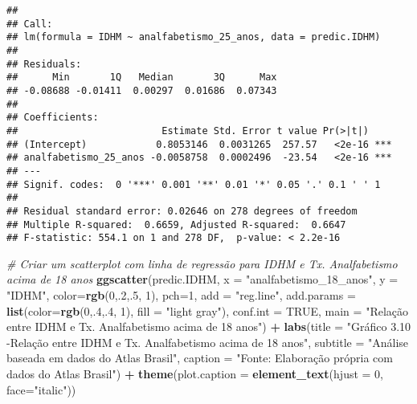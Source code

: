 \documentclass[
]{article}
\newenvironment{Shaded}{\begin{snugshade}}{\end{snugshade}}
\newcommand{\AttributeTok}[1]{\textcolor[rgb]{0.13,0.29,0.53}{#1}}
\newcommand{\CommentTok}[1]{\textcolor[rgb]{0.56,0.35,0.01}{\textit{#1}}}
\newcommand{\ConstantTok}[1]{\textcolor[rgb]{0.56,0.35,0.01}{#1}}
\newcommand{\DecValTok}[1]{\textcolor[rgb]{0.00,0.00,0.81}{#1}}
\newcommand{\FunctionTok}[1]{\textcolor[rgb]{0.13,0.29,0.53}{\textbf{#1}}}
\newcommand{\NormalTok}[1]{#1}
\newcommand{\SpecialCharTok}[1]{\textcolor[rgb]{0.81,0.36,0.00}{\textbf{#1}}}
\newcommand{\StringTok}[1]{\textcolor[rgb]{0.31,0.60,0.02}{#1}}
\begin{document}
\begin{verbatim}
## 
## Call:
## lm(formula = IDHM ~ analfabetismo_25_anos, data = predic.IDHM)
## 
## Residuals:
##      Min       1Q   Median       3Q      Max 
## -0.08688 -0.01411  0.00297  0.01686  0.07343 
## 
## Coefficients:
##                         Estimate Std. Error t value Pr(>|t|)    
## (Intercept)            0.8053146  0.0031265  257.57   <2e-16 ***
## analfabetismo_25_anos -0.0058758  0.0002496  -23.54   <2e-16 ***
## ---
## Signif. codes:  0 '***' 0.001 '**' 0.01 '*' 0.05 '.' 0.1 ' ' 1
## 
## Residual standard error: 0.02646 on 278 degrees of freedom
## Multiple R-squared:  0.6659, Adjusted R-squared:  0.6647 
## F-statistic: 554.1 on 1 and 278 DF,  p-value: < 2.2e-16
\end{verbatim}

\begin{Shaded}
\begin{Highlighting}[]
\CommentTok{\# Criar um scatterplot com linha de regressão para IDHM e Tx. Analfabetismo acima de 18 anos}
\FunctionTok{ggscatter}\NormalTok{(predic.IDHM, }\AttributeTok{x =} \StringTok{"analfabetismo\_18\_anos"}\NormalTok{, }\AttributeTok{y =} \StringTok{"IDHM"}\NormalTok{, }
          \AttributeTok{color=}\FunctionTok{rgb}\NormalTok{(}\DecValTok{0}\NormalTok{,.}\DecValTok{2}\NormalTok{,.}\DecValTok{5}\NormalTok{,  }\DecValTok{1}\NormalTok{), }\AttributeTok{pch=}\DecValTok{1}\NormalTok{, }\AttributeTok{add =} \StringTok{"reg.line"}\NormalTok{, }
          \AttributeTok{add.params =} \FunctionTok{list}\NormalTok{(}\AttributeTok{color=}\FunctionTok{rgb}\NormalTok{(}\DecValTok{0}\NormalTok{,.}\DecValTok{4}\NormalTok{,.}\DecValTok{4}\NormalTok{,  }\DecValTok{1}\NormalTok{), }\AttributeTok{fill =} \StringTok{"light gray"}\NormalTok{), }
          \AttributeTok{conf.int =} \ConstantTok{TRUE}\NormalTok{, }\AttributeTok{main =} \StringTok{"Relação entre IDHM e Tx. Analfabetismo acima de 18 anos"}\NormalTok{) }\SpecialCharTok{+}
  \FunctionTok{labs}\NormalTok{(}\AttributeTok{title =} \StringTok{"Gráfico 3.10 {-}Relação entre IDHM e Tx. Analfabetismo acima de 18 anos"}\NormalTok{,}
       \AttributeTok{subtitle =} \StringTok{"Análise baseada em dados do Atlas Brasil"}\NormalTok{,}
       \AttributeTok{caption =} \StringTok{"Fonte: Elaboração própria com dados do Atlas Brasil"}\NormalTok{) }\SpecialCharTok{+}
  \FunctionTok{theme}\NormalTok{(}\AttributeTok{plot.caption =} \FunctionTok{element\_text}\NormalTok{(}\AttributeTok{hjust =} \DecValTok{0}\NormalTok{, }\AttributeTok{face=}\StringTok{"italic"}\NormalTok{))}
\end{Highlighting}
\end{Shaded}
\end{document}
